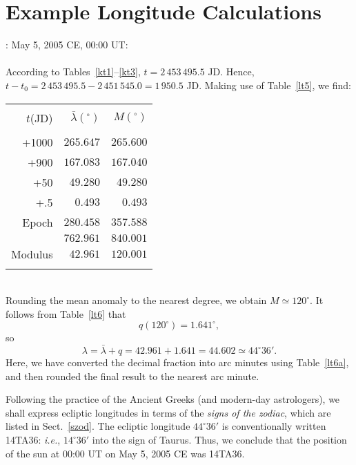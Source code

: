\section{Example Longitude Calculations}
: May 5, 2005 CE, 00:00 UT:\\
~\\
According to Tables~\ref{kt1}--\ref{kt3}, $t = 2\,453\,495.5$ JD. Hence,
$t-t_0 = 2\,453\,495.5-2\,451\,545.0=1\,950.5$ JD. Making use of
Table~\ref{lt5}, we find:\\
\begin{tabular}{rrr}
&&\\
$t$(JD) & $ \bar{\lambda}(^\circ)$ & $M(^\circ)$\\[-2ex]
&&\\
+1000 & $265.647$ & $265.600$\\
+900 & $167.083$ & $167.040$\\
+50 & $49.280$ & $49.280$\\
+.5 & $0.493$ & $0.493$\\
Epoch & $280.458$ & $357.588$\\\cline{2-3}
&$762.961$ & $840.001$\\\cline{2-3}
Modulus & $42.961$ & $120.001$\\ 
&&\\
\end{tabular}\\
Rounding the mean anomaly to the nearest degree, we obtain $M\simeq 120^\circ$.
It follows from  Table~\ref{lt6} that
$$
q(120^\circ)= 1.641^\circ,
$$ 
so
$$
\lambda =\bar{\lambda} + q =42.961+ 1.641=44.602\simeq 44^\circ36'.
$$
Here, we have converted the decimal fraction into arc
minutes using Table~\ref{lt6a}, and 
then rounded the final result to the nearest arc minute.

 Following
the practice of the Ancient Greeks (and modern-day astrologers), we shall express ecliptic longitudes
in terms of the {\em signs of the zodiac}, which  are listed in Sect.~\ref{szod}. The ecliptic longitude $44^\circ36'$ is conventionally written 14TA36: {\em i.e.}, 
$14^\circ36'$ into the sign of Taurus. Thus, we conclude that the position of
the sun 
at 00:00 UT on May 5, 2005 CE was 14TA36.

